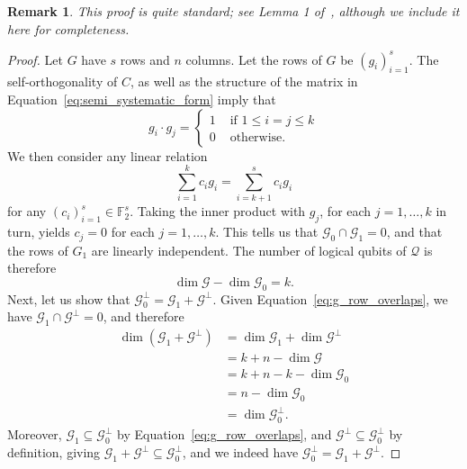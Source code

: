 \documentclass{article}
\newcounter{main}[section]
\newtheorem{remark}[main]{Remark}
\begin{document}
\begin{remark}
    This proof is quite standard; see Lemma 1 of~\cite{bravyi2012magic}, although we include it here for completeness.
\end{remark}
\begin{proof}
    Let $G$ have $s$ rows and $n$ columns. Let the rows of $G$ be $(g_i)_{i=1}^s$. The self-orthogonality of $C$, as well as the structure of the matrix in Equation~\eqref{eq:semi_systematic_form} imply that
    \begin{equation}\label{eq:g_row_overlaps}
        g_i \cdot g_j = \begin{cases}
            1 &\text{ if } 1 \leq i = j \leq k\\
            0 &\text{ otherwise.}
        \end{cases}
    \end{equation}
    We then consider any linear relation
    \begin{equation}
        \sum_{i=1}^kc_ig_i = \sum_{i=k+1}^sc_ig_i
    \end{equation}
    for any $(c_i)_{i=1}^s \in \mathbb{F}_2^s$. Taking the inner product with $g_j$, for each $j = 1, \ldots, k$ in turn, yields $c_j = 0$ for each $j = 1, \ldots, k$. This tells us that $\mathcal{G}_0 \cap \mathcal{G}_1 = 0$, and that the rows of $G_1$ are linearly independent. The number of logical qubits of $\mathcal{Q}$ is therefore
    \begin{equation}
        \dim\mathcal{G} - \dim\mathcal{G}_0 = k.
    \end{equation}
    Next, let us show that $\mathcal{G}_0^\perp = \mathcal{G}_1 + \mathcal{G}^\perp$. Given Equation~\eqref{eq:g_row_overlaps}, we have $\mathcal{G}_1 \cap \mathcal{G}^\perp = 0$, and therefore
    \begin{align}
        \dim(\mathcal{G}_1+\mathcal{G}^\perp) &= \dim\mathcal{G}_1 + \dim\mathcal{G}^\perp\\
        &= k + n - \dim\mathcal{G}\\
        &= k + n - k - \dim\mathcal{G}_0\\
        &=n-\dim\mathcal{G}_0\\
        &= \dim\mathcal{G}_0^\perp.
    \end{align}
    Moreover, $\mathcal{G}_1 \subseteq \mathcal{G}_0^\perp$ by Equation~\eqref{eq:g_row_overlaps}, and $\mathcal{G}^\perp \subseteq \mathcal{G}_0^\perp$ by definition, giving $\mathcal{G}_1 + \mathcal{G}^\perp \subseteq \mathcal{G}_0^\perp$, and we indeed have $\mathcal{G}_0^\perp = \mathcal{G}_1 + \mathcal{G}^\perp$.


\end{proof}
\end{document}
